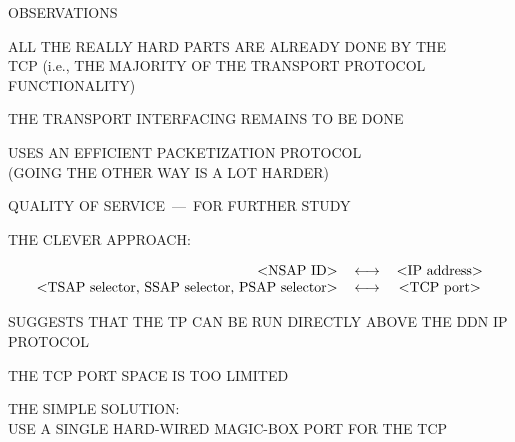 \begin{bwslide}

\begin{nrtc}
\item	OBSERVATIONS
    \begin{nrtc}
    \item	ALL THE REALLY HARD PARTS ARE ALREADY DONE BY THE\\ TCP
		(i.e., THE MAJORITY OF THE TRANSPORT PROTOCOL\\ FUNCTIONALITY)

    \item	THE TRANSPORT INTERFACING REMAINS TO BE DONE
    \end{nrtc}

\item	USES AN EFFICIENT PACKETIZATION PROTOCOL\\
	(GOING THE OTHER WAY IS A LOT HARDER)

\item	QUALITY OF SERVICE~---~FOR FURTHER STUDY
\end{nrtc}
\end{bwslide}


\begin{bwslide}

THE CLEVER APPROACH:
\begin{small}
\[\begin{tabular}{rlc}
	$<$NSAP ID$>$&		$\longleftrightarrow$&	$<$IP address$>$\\
	$<$TSAP selector, SSAP selector, PSAP selector$>$&
				$\longleftrightarrow$&	$<$TCP port$>$
\end{tabular}\]
\end{small}

\begin{nrtc}
\item	SUGGESTS THAT THE TP CAN BE RUN DIRECTLY ABOVE THE DDN IP PROTOCOL
\end{nrtc}
\end{bwslide}



\begin{bwslide}

\begin{nrtc}
\item	THE TCP PORT SPACE IS TOO LIMITED

\item	THE SIMPLE SOLUTION:\\
	USE A SINGLE HARD-WIRED MAGIC-BOX PORT FOR THE TCP
\end{nrtc}
\end{bwslide}


